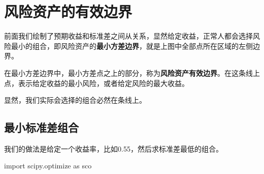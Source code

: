 \documentclass[
  letterpaper,
  DIV=11,
  numbers=noendperiod]{scrreprt}
\newenvironment{Shaded}{\begin{snugshade}}{\end{snugshade}}
\newcommand{\ImportTok}[1]{\textcolor[rgb]{0.00,0.46,0.62}{#1}}
\newcommand{\NormalTok}[1]{\textcolor[rgb]{0.00,0.23,0.31}{#1}}
\begin{document}
\hypertarget{ux98ceux9669ux8d44ux4ea7ux7684ux6709ux6548ux8fb9ux754c}{%
\section{风险资产的有效边界}\label{ux98ceux9669ux8d44ux4ea7ux7684ux6709ux6548ux8fb9ux754c}}

前面我们绘制了预期收益和标准差之间从关系，显然给定收益，正常人都会选择风险最小的组合，即风险资产的\textbf{最小方差边界}，就是上图中全部点所在区域的左侧边界。

在最小方差边界中，最小方差点之上的部分，称为\textbf{风险资产有效边界}。在这条线上点，表示给定收益的最小风险，或者给定风险的最大收益。

显然，我们实际会选择的组合必然在条线上。

\hypertarget{ux6700ux5c0fux6807ux51c6ux5deeux7ec4ux5408}{%
\subsection{最小标准差组合}\label{ux6700ux5c0fux6807ux51c6ux5deeux7ec4ux5408}}

我们的做法是给定一个收益率，比如0.55，然后求标准差最低的组合。

\begin{Shaded}
\begin{Highlighting}[]
\ImportTok{import}\NormalTok{ scipy.optimize }\ImportTok{as}\NormalTok{ sco}
\end{Highlighting}
\end{Shaded}
\end{document}
